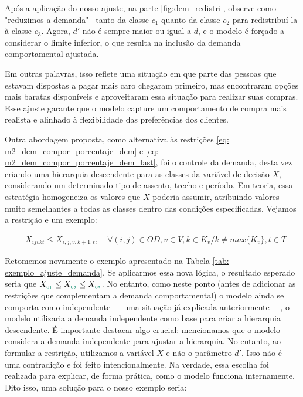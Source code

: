 Após a aplicação do nosso ajuste, na parte \ref{fig:dem_redistri}, observe como "reduzimos a demanda" \, tanto da classe $c_1$ quanto da classe $c_2$ para redistribuí-la à classe $c_3$. Agora, $d'$ não é sempre maior ou igual a $d$, e o modelo é forçado a considerar o limite inferior, o que resulta na inclusão da demanda comportamental ajustada.

Em outras palavras, isso reflete uma situação em que parte das pessoas que estavam dispostas a pagar mais caro chegaram primeiro, mas encontraram opções mais baratas disponíveis e aproveitaram essa situação para realizar suas compras. Esse ajuste garante que o modelo capture um comportamento de compra mais realista e alinhado à flexibilidade das preferências dos clientes.

Outra abordagem proposta, como alternativa às restrições \ref{eq: m2_dem_compor_porcentaje_dem} e \ref{eq: m2_dem_compor_porcentaje_dem_last}, foi o controle da demanda, desta vez criando uma hierarquia descendente para as classes da variável de decisão $X$, considerando um determinado tipo de assento, trecho e período. Em teoria, essa estratégia homogeneiza os valores que $X$ poderia assumir, atribuindo valores muito semelhantes a todas as classes dentro das condições especificadas. Vejamos a restrição e um exemplo:

\allowdisplaybreaks
\begin{align}
	&X_{ijvkt} \leq X_{i,j,v,k+1,t}, \quad   \forall(i,j) \in OD, v \in V, k \in K_v / k \neq max\{K_v\}, t \in T  \label{eq: m2_ajuste_hierarquia}
\end{align}

Retomemos novamente o exemplo apresentado na Tabela \ref{tab: exemplo_ajuste_demanda}. Se aplicarmos essa nova lógica, o resultado esperado seria que $X_{\textcolor[rgb]{0.0588, 0.5412, 0.4275}{c_1}} \leq X_{\textcolor[rgb]{0.0588, 0.5412, 0.4275}{c_2}} \leq X_{\textcolor[rgb]{0.0588, 0.5412, 0.4275}{c_3}}$. No entanto, como neste ponto (antes de adicionar as restrições que complementam a demanda comportamental) o modelo ainda se comporta como independente — uma situação já explicada anteriormente —, o modelo utilizaria a demanda independente como base para criar a hierarquia descendente. É importante destacar algo crucial: mencionamos que o modelo considera a demanda independente para ajustar a hierarquia. No entanto, ao formular a restrição, utilizamos a variável $X$ e não o parâmetro $d'$. Isso não é uma contradição e foi feito intencionalmente. Na verdade, essa escolha foi realizada para explicar, de forma prática, como o modelo funciona internamente. Dito isso, uma solução para o nosso exemplo seria:

